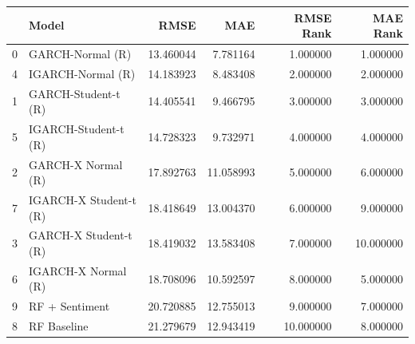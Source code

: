 \begin{table}[htbp]
\centering
\begin{tabular}{llrrrr}
\toprule
 & Model & RMSE & MAE & RMSE Rank & MAE Rank \\
\midrule
0 & GARCH-Normal (R) & 13.460044 & 7.781164 & 1.000000 & 1.000000 \\
4 & IGARCH-Normal (R) & 14.183923 & 8.483408 & 2.000000 & 2.000000 \\
1 & GARCH-Student-t (R) & 14.405541 & 9.466795 & 3.000000 & 3.000000 \\
5 & IGARCH-Student-t (R) & 14.728323 & 9.732971 & 4.000000 & 4.000000 \\
2 & GARCH-X Normal (R) & 17.892763 & 11.058993 & 5.000000 & 6.000000 \\
7 & IGARCH-X Student-t (R) & 18.418649 & 13.004370 & 6.000000 & 9.000000 \\
3 & GARCH-X Student-t (R) & 18.419032 & 13.583408 & 7.000000 & 10.000000 \\
6 & IGARCH-X Normal (R) & 18.708096 & 10.592597 & 8.000000 & 5.000000 \\
9 & RF + Sentiment & 20.720885 & 12.755013 & 9.000000 & 7.000000 \\
8 & RF Baseline & 21.279679 & 12.943419 & 10.000000 & 8.000000 \\
\bottomrule
\end{tabular}
\label{tab:robustness_rmse_mae}
\end{table}
